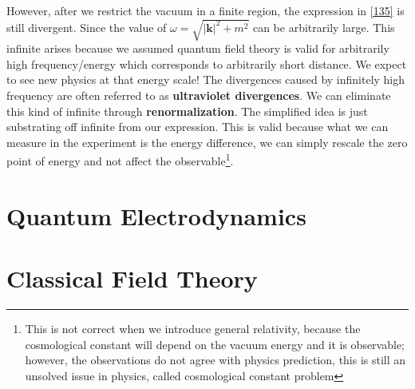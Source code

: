 \documentclass[12pt]{article}
\numberwithin{equation}{section}
\theoremstyle{1style}
\newcommand{\tbf}[1]{\textbf{#1}}
\begin{document}
However, after we restrict the vacuum in a finite region, the expression in \ref{135} is still divergent.
Since the value of \(\omega=\sqrt{|\mathbf{k}|^2+m^2}\) can be arbitrarily large.
This infinite arises because we assumed quantum field theory is valid for arbitrarily high frequency/energy
which corresponds to arbitrarily short distance. We expect to see new physics at that energy scale!
The divergences caused by infinitely high frequency are often referred to as \tbf{ultraviolet divergences}.
We can eliminate this kind of infinite through \tbf{renormalization}.
The simplified idea is just substrating off infinite from our expression.
This is valid because what we can measure in the experiment is the energy difference,
we can simply rescale the zero point of energy and not affect the observable\footnote{This is not correct when we introduce general relativity, 
because the cosmological constant will depend on the vacuum energy and it is observable; however, 
the observations do not agree with physics prediction,
this is still an unsolved issue in physics, called cosmological constant problem}.


\newpage
\section{Quantum Electrodynamics}


\newpage
\appendix
{}

\section{Classical Field Theory}



\newpage
\end{document}
